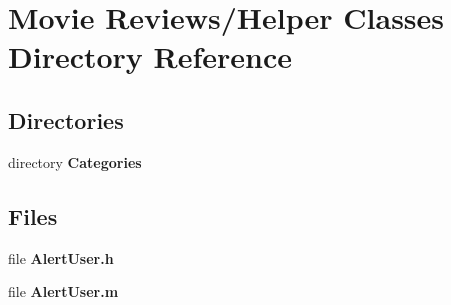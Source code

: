 \section{Movie Reviews/\+Helper Classes Directory Reference}
\label{dir_6cfa45f75ab4e77128eeaedea58ba572}
\subsection*{Directories}
\begin{DoxyCompactItemize}
\item 
directory {\bf Categories}
\end{DoxyCompactItemize}
\subsection*{Files}
\begin{DoxyCompactItemize}
\item 
file {\bfseries Alert\+User.\+h}
\item 
file {\bfseries Alert\+User.\+m}
\end{DoxyCompactItemize}
